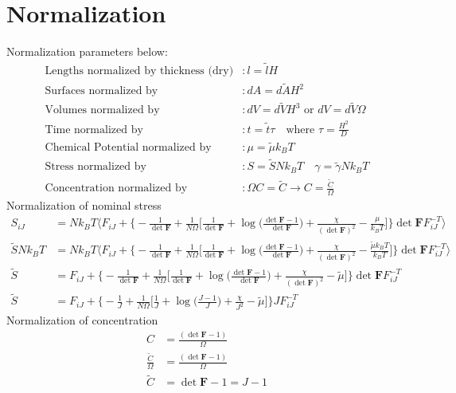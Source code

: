 \documentclass[12pt,3p]{article}
\numberwithin{equation}{section}
\begin{document}
\newpage

\section{Normalization}
Normalization parameters below:
\begin{align*}
\text{Lengths normalized by thickness (dry)}&: l = \tilde{l} H \\
\text{Surfaces normalized by}&: dA = d \tilde{A} H^2 \\
\text{Volumes normalized by}&: dV = d \tilde{V} H^3 \text{ or } dV = d \tilde{V} \Omega \\ 
\text{Time normalized by}&: t = \tilde{t} \tau \quad \text{where } \tau = \frac{H^2}{D} \\
\text{Chemical Potential normalized by}&: \mu = \tilde{\mu} k_B T \\
\text{Stress normalized by}&: S= \tilde{S} N k_B T \quad \gamma = \tilde{\gamma} N k_B T \\
\text{Concentration normalized by}&: \Omega C = \tilde{C} \rightarrow C = \frac{\tilde{C}}{\Omega} 
\end{align*}
Normalization of nominal stress
\begin{align*}
S_{iJ} &= N k_B T \bigg \langle F_{iJ} + \bigg\{- \frac{1}{\det \mathbf{F}} + \frac{1}{N \Omega} \bigg[ \frac{1}{\det \mathbf{F}} + \log \bigg( \frac{\det \mathbf{F} - 1}{\det \mathbf{F}} \bigg) + \frac{\chi}{(\det \mathbf{F})^2} - \frac{\mu}{k_B T} \bigg] \bigg\} \det \mathbf{F} F_{iJ}^{-T}\bigg \rangle \\
\tilde{S} N k_B T &= N k_B T \bigg \langle F_{iJ} + \bigg\{- \frac{1}{\det \mathbf{F}} + \frac{1}{N \Omega} \bigg[ \frac{1}{\det \mathbf{F}} + \log \bigg( \frac{\det \mathbf{F} - 1}{\det \mathbf{F}} \bigg) + \frac{\chi}{(\det \mathbf{F})^2} - \frac{\tilde{\mu} k_B T}{k_B T} \bigg] \bigg\} \det \mathbf{F} F_{iJ}^{-T} \bigg \rangle\\
\tilde{S} &=  F_{iJ} + \bigg\{- \frac{1}{\det \mathbf{F}} + \frac{1}{N \Omega} \bigg[ \frac{1}{\det \mathbf{F}} + \log \bigg( \frac{\det \mathbf{F} - 1}{\det \mathbf{F}} \bigg) + \frac{\chi}{(\det \mathbf{F})^2} - \tilde{\mu} \bigg] \bigg\} \det \mathbf{F} F_{iJ}^{-T} \\
\tilde{S} &=  F_{iJ} + \bigg\{- \frac{1}{J} + \frac{1}{N \Omega}  \bigg[ \frac{1}{J} + \log \bigg( \frac{J - 1}{J} \bigg) + \frac{\chi}{J^2} - \tilde{\mu} \bigg] \bigg\} J F_{iJ}^{-T} 
\end{align*}
Normalization of concentration
\begin{align*}
C &= \frac{(\det \mathbf{F} - 1)}{\Omega} \\
\frac{\tilde{C}}{\Omega} &= \frac{(\det \mathbf{F} - 1)}{\Omega} \\
\tilde{C} &= \det \mathbf{F} - 1 = J - 1
\end{align*}
\end{document}
